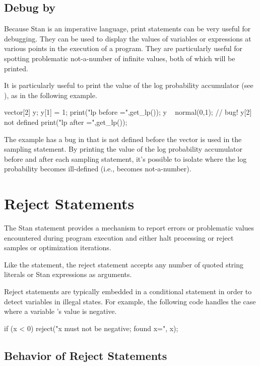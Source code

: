\subsection{Debug by }

Because Stan is an imperative language, print statements can be very
useful for debugging.  They can be used to display the values of
variables or expressions at various points in the execution of a
program.  They are particularly useful for spotting problematic
not-a-number of infinite values, both of which will be printed.

It is particularly useful to print the value of the log probability
accumulator (see ), as in the following example.
%
\begin{stancode}
vector[2] y;
y[1] = 1;
print("lp before =",get_lp());
y ~ normal(0,1); // bug!  y[2] not defined
print("lp after =",get_lp());
\end{stancode}
%
The example has a bug in that  is not defined before the
vector  is used in the sampling statement.  By printing the
value of the log probability accumulator before and after each
sampling statement, it's possible to isolate where the log probability
becomes ill-defined (i.e., becomes not-a-number).

\section{Reject Statements}\label{reject-statements.section}

The Stan  statement provides a mechanism to
report errors or problematic values encountered during program
execution and either halt processing or reject samples or optimization
iterations.

Like the  statement, the reject statement accepts
any number of quoted string literals or Stan expressions as arguments.

Reject statements are typically embedded in a conditional
statement in order to detect variables in illegal states.  For
example, the following code handles the case where a variable 's
value is negative.
%
\begin{stancode}
if (x < 0)
  reject("x must not be negative; found x=", x);
\end{stancode}

\subsection{Behavior of Reject Statements}

